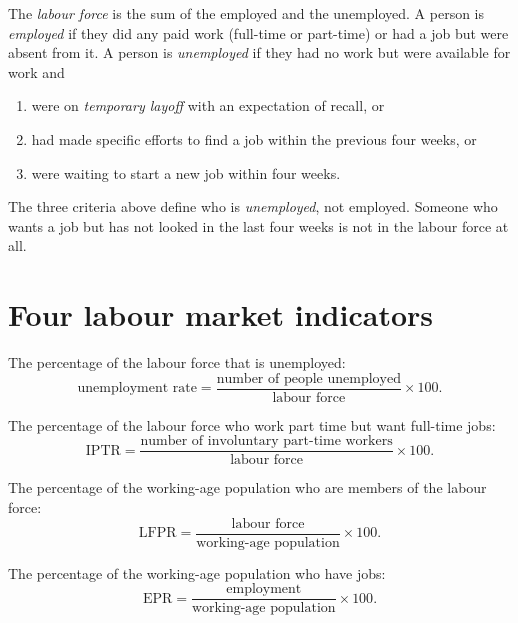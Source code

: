 \begin{definition}
The \emph{labour force} is the sum of the employed and the unemployed. A person is
\emph{employed} if they did any paid work (full-time or part-time) or had a job but were
absent from it. A person is \emph{unemployed} if they had no work but were available for
work and
\begin{enumerate}
  \item were on \emph{temporary layoff} with an expectation of recall, or
  \item had made specific efforts to find a job within the previous four weeks, or
  \item were waiting to start a new job within four weeks.
\end{enumerate}
\end{definition}

\begin{important}[Pitfall]
The three criteria above define who is \emph{unemployed}, not employed. Someone who
wants a job but has not looked in the last four weeks is not in the labour force at all.
\end{important}

\section{Four labour market indicators}

\begin{definition}
The percentage of the labour force that is unemployed:
\[
  \text{unemployment rate} = \frac{\text{number of people unemployed}}{\text{labour force}}
  \times 100.
\]
\end{definition}

\begin{definition}
The percentage of the labour force who work part time but want full-time jobs:
\[
  \text{IPTR} = \frac{\text{number of involuntary part-time workers}}{\text{labour force}}
  \times 100.
\]
\end{definition}

\begin{definition}
The percentage of the working-age population who are members of the labour force:
\[
  \text{LFPR} = \frac{\text{labour force}}{\text{working-age population}} \times 100.
\]
\end{definition}

\begin{definition}
The percentage of the working-age population who have jobs:
\[
  \text{EPR} = \frac{\text{employment}}{\text{working-age population}} \times 100.
\]
\end{definition}

